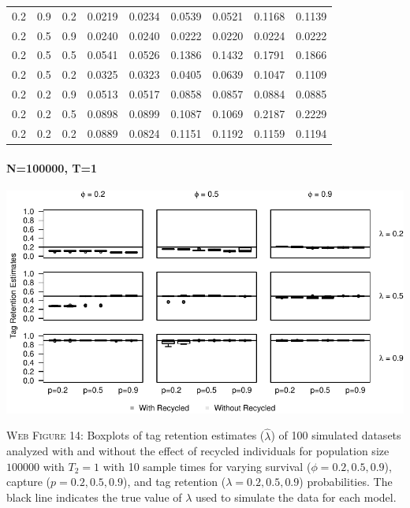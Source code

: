 \documentclass[]{article}
\let\oldparagraph\paragraph
\renewcommand{\paragraph}[1]{\oldparagraph{#1}\mbox{}}
\begin{document}
\begin{table}[ht]
{\begin{tabular}{rrrrrrrrr}
  0.2 & 0.9 & 0.2 & 0.0219 & 0.0234 & 0.0539 & 0.0521 & 0.1168 & 0.1139 \\ 
  0.2 & 0.5 & 0.9 & 0.0240 & 0.0240 & 0.0222 & 0.0220 & 0.0224 & 0.0222 \\ 
  0.2 & 0.5 & 0.5 & 0.0541 & 0.0526 & 0.1386 & 0.1432 & 0.1791 & 0.1866 \\ 
  0.2 & 0.5 & 0.2 & 0.0325 & 0.0323 & 0.0405 & 0.0639 & 0.1047 & 0.1109 \\ 
  0.2 & 0.2 & 0.9 & 0.0513 & 0.0517 & 0.0858 & 0.0857 & 0.0884 & 0.0885 \\ 
  0.2 & 0.2 & 0.5 & 0.0898 & 0.0899 & 0.1087 & 0.1069 & 0.2187 & 0.2229 \\ 
  0.2 & 0.2 & 0.2 & 0.0889 & 0.0824 & 0.1151 & 0.1192 & 0.1159 & 0.1194 \\ 
   \hline
\end{tabular}
}
\endgroup
\end{table}

\newpage

\paragraph{N=100000, T=1}\label{n100000-t1-2}

\includegraphics{Appendix_BW_files/figure-latex/figure14_tagretention_GJSTL2-1.pdf}

\textsc{Web Figure 14:} Boxplots of tag retention estimates
(\(\hat{\lambda}\)) of 100 simulated datasets analyzed with and without
the effect of recycled individuals for population size \(100000\) with
\(T_2=1\) with 10 sample times for varying survival
(\(\phi=0.2,0.5,0.9\)), capture (\(p=0.2,0.5,0.9\)), and tag retention
(\(\lambda=0.2,0.5,0.9\)) probabilities. The black line indicates the
true value of \(\lambda\) used to simulate the data for each model.
\end{document}
